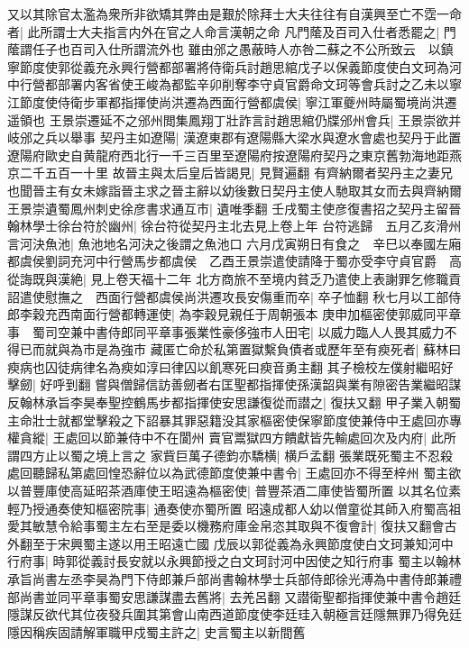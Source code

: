 又以其除官太濫為衆所非欲矯其弊由是艱於除拜士大夫往往有自漢興至亡不霑一命者|{
	此所謂士大夫指言内外在官之人命言漢朝之命}
凡門䕃及百司入仕者悉罷之|{
	門䕃謂任子也百司入仕所謂流外也}
雖由邠之愚蔽時人亦咎二蘇之不公所致云　以鎮寧節度使郭從義充永興行營都部署將侍衛兵討趙思綰戊子以保義節度使白文珂為河中行營都部署内客省使王峻為都監辛卯削奪李守貞官爵命文珂等會兵討之乙未以寧江節度使侍衛步軍都指揮使尚洪遷為西面行營都虞侯|{
	寧江軍夔州時屬蜀境尚洪遷遥領也}
王景崇遷延不之邠州閲集鳳翔丁壯詐言討趙思綰仍牒邠州會兵|{
	王景崇欲并岐邠之兵以舉事}
契丹主如遼陽|{
	漢遼東郡有遼陽縣大梁水與遼水會處也契丹于此置遼陽府歐史自黄龍府西北行一千三百里至遼陽府按遼陽府契丹之東京舊勃海地距燕京二千五百一十里}
故晉主與太后皇后皆謁見|{
	見賢遍翻}
有齊納爾者契丹主之妻兄也聞晉主有女未嫁詣晉主求之晉主辭以幼後數日契丹主使人馳取其女而去與齊納爾　王景崇遺蜀鳳州刺史徐彦書求通互市|{
	遺唯季翻}
壬戌蜀主使彦復書招之契丹主留晉翰林學士徐台符於幽州|{
	徐台符從契丹主北去見上卷上年}
台符逃歸　五月乙亥滑州言河決魚池|{
	魚池地名河決之後謂之魚池口}
六月戊寅朔日有食之　辛巳以奉國左廂都虞侯劉詞充河中行營馬步都虞侯　乙酉王景崇遣使請降于蜀亦受李守貞官爵　高從誨既與漢絶|{
	見上卷天福十二年}
北方商旅不至境内貧乏乃遣使上表謝罪乞修職貢詔遣使慰撫之　西面行營都虞侯尚洪遷攻長安傷重而卒|{
	卒子恤翻}
秋七月以工部侍郎李穀充西南面行營都轉運使|{
	為李穀見親任于周朝張本}
庚申加樞密使郭威同平章事　蜀司空兼中書侍郎同平章事張業性豪侈強市人田宅|{
	以威力臨人人畏其威力不得已而就與為市是為強市}
藏匿亡命於私第置獄繫負債者或歷年至有瘐死者|{
	蘇林曰瘐病也囚徒病律名為瘐如淳曰律囚以飢寒死曰瘐音勇主翻}
其子檢校左僕射繼昭好擊劒|{
	好呼到翻}
嘗與僧歸信訪善劒者右匡聖都指揮使孫漢韶與業有隙密告業繼昭謀反翰林承旨李昊奉聖控鶴馬步都指揮使安思謙復從而譛之|{
	復扶又翻}
甲子業入朝蜀主命壯士就都堂擊殺之下詔暴其罪惡籍没其家樞密使保寧節度使兼侍中王處回亦專權貪縱|{
	王處回以節兼侍中不在閬州}
賣官鬻獄四方饋獻皆先輸處回次及内府|{
	此所謂四方止以蜀之境上言之}
家貲巨萬子德鈞亦驕横|{
	横戶孟翻}
張業既死蜀主不忍殺處回聽歸私第處回惶恐辭位以為武德節度使兼中書令|{
	王處回亦不得至梓州}
蜀主欲以普豐庫使高延昭茶酒庫使王昭遠為樞密使|{
	普豐茶酒二庫使皆蜀所置}
以其名位素輕乃授通奏使知樞密院事|{
	通奏使亦蜀所置}
昭遠成都人幼以僧童從其師入府蜀高祖愛其敏慧令給事蜀主左右至是委以機務府庫金帛恣其取與不復會計|{
	復扶又翻會古外翻至于宋興蜀主遂以用王昭遠亡國}
戊辰以郭從義為永興節度使白文珂兼知河中行府事|{
	時郭從義討長安就以永興節授之白文珂討河中因使之知行府事}
蜀主以翰林承旨尚書左丞李昊為門下侍郎兼戶部尚書翰林學士兵部侍郎徐光溥為中書侍郎兼禮部尚書並同平章事蜀安思謙謀盡去舊將|{
	去羌呂翻}
又譛衛聖都指揮使兼中書令趙廷隱謀反欲代其位夜發兵圍其第會山南西道節度使李廷珪入朝極言廷隱無罪乃得免廷隱因稱疾固請解軍職甲戍蜀主許之|{
	史言蜀主以新間舊}
